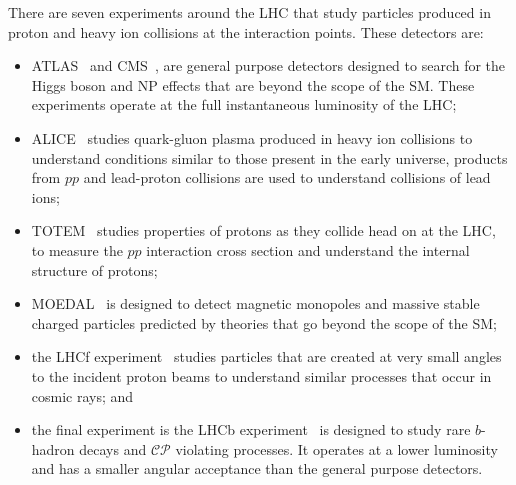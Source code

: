 There are seven experiments around the LHC that study particles produced in proton and heavy ion collisions at the interaction points. These detectors are: %
\begin{itemize}
\item ATLAS~\cite{Aad:2008zzm} and CMS~\cite{Chatrchyan:2008aa}, are general purpose detectors designed to search for the Higgs boson and NP effects that are beyond the scope of the SM. These experiments operate at the full instantaneous luminosity of the LHC; %
\item ALICE~\cite{Aamodt:2008zz} studies quark-gluon plasma produced in heavy ion collisions to understand conditions similar to those present in the early universe, products from $pp$ and lead-proton collisions are used to understand collisions of lead ions;
\item  TOTEM~\cite{Anelli:2008zza} studies properties of protons as they collide head on at the LHC, to measure the $pp$ interaction cross section and understand the internal structure of protons; %
\item MOEDAL~\cite{Pinfold:2009oia} is designed to detect magnetic monopoles and massive stable charged particles predicted by theories that go beyond the scope of the SM;
\item the LHCf experiment~\cite{Adriani:2008zz} studies particles that are created at very small angles to the incident proton beams to understand similar processes that occur in cosmic rays; and %
\item the final experiment is the LHCb experiment~\cite{Alves:2008zz} is designed to study rare $b$-hadron decays and $\mathcal{CP}$ violating processes. It operates at a lower luminosity and has a smaller angular acceptance than the general purpose detectors. 
\end{itemize}

